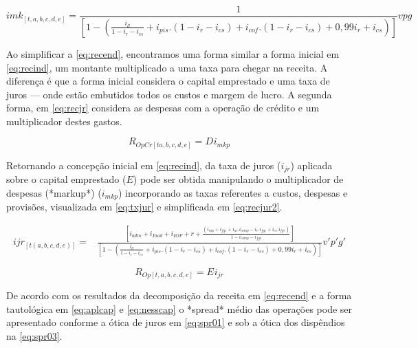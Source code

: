 \documentclass[
  12pt,
  12pt,
  openright,
  oneside,
  a4paper,
  chapter=TITLE,
  section=TITLE,
  subsection=TITLE,
  subsubsection=TITLE,
  english,
  portugues,
  sumario=tradicional]{abntex2}
\begin{document}
\begin{apendicesenv}
\begin{equation}\label{eq:denom}
imk_{[t,a,b,c,d,e]} = \frac{1}{[1 - (\frac{i_{ll}}{1 - i_{r} - i_{cs}} + i_{pis}.(1 - i_{r} - i_{cs}) + i_{cof}.(1 - i_{r} - i_{cs}) + 0,99i_{r} + i_{cs})]}vpg
\end{equation}



Ao simplificar a \autoref{eq:recend}, encontramos uma forma similar a forma inicial em \autoref{eq:recind}, um montante multiplicado a uma taxa para chegar na receita. A diferença é que a forma inicial considera o capital emprestado e uma taxa de juros — onde estão embutidos todos os custos e margem de lucro. A segunda forma, em \autoref{eq:recjr} considera as despesas com a operação de crédito e um multiplicador destes gastos.



\begin{equation}\label{eq:recjr}
R_{OpCr[ta,b,c,d,e]} = D_{} i_{mkp}
\end{equation}



Retornando a concepção inicial em \autoref{eq:recind}, da taxa de juros ($i_{jr}$) aplicada sobre o capital emprestado ($E$) pode ser obtida manipulando o multiplicador de despesas (*markup*) ($i_{mkp}$) incorporando as taxas referentes a custos, despesas e provisões, visualizada em \autoref{eq:txjur} e simplificada em \autoref{eq:recjur2}.



\begin{equation}\label{eq:txjur}
\begin{aligned}
ijr_{[t(a,b,c,d,e)]} = & \frac{[i_{adm} + i_{Inad} + i_{IOF} + r +  \frac{(i_{cap} + i_{fgc} + i_{ac}.i_{comp} - i_{r}.i_{fgc}+ i_{cs}.i_{fgc})}{1 - i_{comp} - i_{fgc}}]}
{[1 - (\frac{i_{ll}}{1 - i_{r} - i_{cs}} + i_{pis}.(1 - i_{r} - i_{cs}) + i_{cof}.(1 - i_{r} - i_{cs}) + 0,99i_{r} + i_{cs})]}v'p'g'
\end{aligned}
\end{equation}




\begin{equation}\label{eq:recjr}
R_{Op[t,a,b,c,d,e]} = E_{}i_{jr}
\end{equation}


De acordo com os resultados da decomposição da receita em \autoref{eq:recend} e a forma tautológica em \autoref{eq:aplcap} e \autoref{eq:nesscap} o *spread* médio das operações pode ser apresentado conforme a ótica de juros em \autoref{eq:spr01} e sob a ótica dos dispêndios na \autoref{eq:spr03}. 


\end{apendicesenv}
\end{document}
